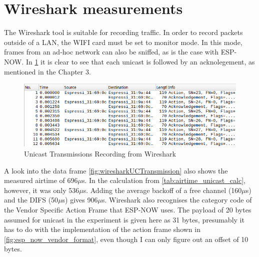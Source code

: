 \section{Wireshark measurements}

The Wireshark tool is suitable for recording traffic.
In order to record packets outside of a LAN, the WIFI card must be set to monitor mode.
In this mode, frames from an ad-hoc network can also be sniffed, as is the case with ESP-NOW.
In \cref{fig:wiresharkUC} it is clear to see that each unicast is followed by an acknolegement, as mentioned in the Chapter 3.

\begin{figure}[h]
	\centering
	\includegraphics[scale=0.5]{figures/wiresharkUC.pdf}
	\caption{Unicast Transmissions Recording from Wireshark}
	\label{fig:wiresharkUC}
\end{figure}

A look into the data frame \cref{fig:wiresharkUCTransmission} also shows the measured airtime of 696$\mu$s.
In the calculation from \cref{tab:airtime_unicast_calc}, however, it was only 536$\mu$s.
Adding the average backoff of a free channel (160$\mu$s) and the DIFS (50$\mu$s) gives 906$\mu$s.
Wireshark also recognises the category code of the Vendor Specific Action Frame that ESP-NOW uses.
The payload of 20 bytes assumed for unicast in the experiment is given here as 31 bytes,
presumably it has to do with the implementation of the action frame shown in \cref{fig:esp_now_vendor_format},
even though I can only figure out an offset of 10 bytes.

